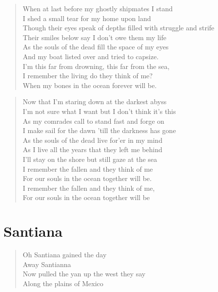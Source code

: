 \documentclass[8pt,twoside]{extarticle}
\newenvironment{xverse}{
	\penalty 10000
	\begin{verse}
	\parskip 4pt
	}
	{
	\end{verse}
	\penalty 0
	}
\begin{document}
\begin{xverse}
When at last before my ghostly shipmates I stand \\
I shed a small tear for my home upon land \\
Though their eyes speak of depths filled with struggle and strife \\
Their smiles below say I don't owe them my life \\
As the souls of the dead fill the space of my eyes \\
And my boat listed over and tried to capsize. \\
I'm this far from drowning, this far from the sea, \\
I remember the living do they think of me? \\
When my bones in the ocean forever will be. \\
\end{xverse}

\begin{xverse}
Now that I'm staring down at the darkest abyss \\
I'm not sure what I want but I don't think it's this \\
As my comrades call to stand fast and forge on \\
I make sail for the dawn 'till the darkness has gone \\
As the souls of the dead live for'er in my mind \\
As I live all the years that they left me behind \\
I'll stay on the shore but still gaze at the sea \\
I remember the fallen and they think of me \\
For our souls in the ocean together will be. \\
I remember the fallen and they think of me, \\
For our souls in the ocean together will be \\
\end{xverse}


\section{Santiana}

\begin{xverse}
Oh Santiana gained the day \\
Away Santianna \\
Now pulled the yan up the west they say \\
Along the plains of Mexico \\
\end{xverse}
\end{document}
